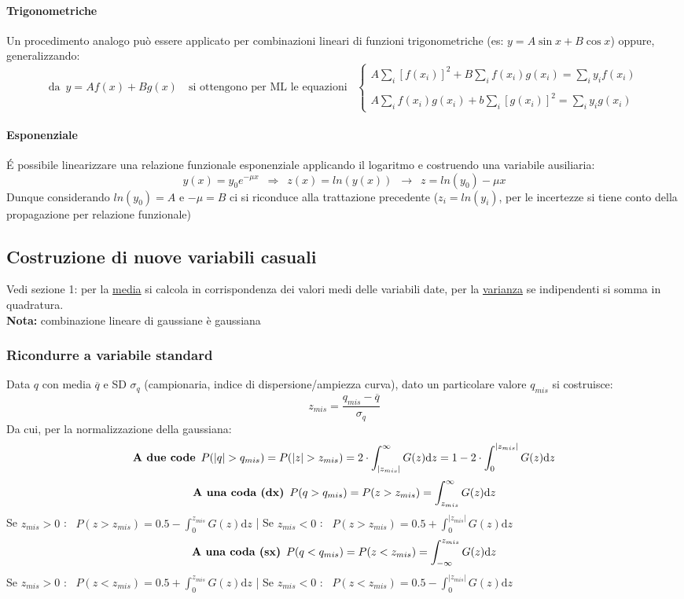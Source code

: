 \documentclass[11pt]{article}
\begin{document}
\paragraph{Trigonometriche}
Un procedimento analogo può essere applicato per combinazioni lineari di funzioni trigonometriche (es: $y = A \sin{x} + B \cos{x}$) oppure, generalizzando:
\[\textrm{da} \enspace y = A f(x) + B g(x) \quad \textrm{si ottengono per ML le equazioni } \enspace \begin{cases} A \sum_i[f(x_i)]^2 + B \sum_i f(x_i) g(x_i) = \sum_i y_i f(x_i)\\\\ A \sum_i f(x_i) g(x_i) + b \sum_i [g(x_i)]^2 = \sum_i y_i g(x_i)\end{cases}\]

\paragraph{Esponenziale}
\'E possibile linearizzare una relazione funzionale esponenziale applicando il logaritmo e costruendo una variabile ausiliaria:
\[y(x) = y_0 e^{-\mu x} \enspace \Longrightarrow \enspace z(x) = ln(y(x)) \enspace \rightarrow \enspace z = ln(y_0) - \mu x\]
Dunque considerando $ln(y_0) = A$ e $-\mu = B$ ci si riconduce alla trattazione precedente ($z_i = ln(y_i)$, per le incertezze si tiene conto della propagazione per relazione funzionale)

\subsection{Costruzione di nuove variabili casuali}
Vedi sezione 1: per la \underline{media} si calcola in corrispondenza dei valori medi delle variabili date, per la \underline{varianza} se indipendenti si somma in quadratura.
\\\textbf{Nota:} combinazione lineare di gaussiane è gaussiana

\subsubsection*{Ricondurre a variabile standard}
Data $q$ con media $\overline{q}$ e SD $\sigma_q$ (campionaria, indice di dispersione/ampiezza curva), dato un particolare valore $q_{mis}$ si costruisce:
\[z_{mis} = \frac{q_{mis} - \overline{q}}{\sigma_q} \]
Da cui, per la normalizzazione della gaussiana:
\[\textrm{\textbf{A due code}} \enspace P(|q| > q_{mis}) = P(|z| > z_{mis}) = 2 \cdot \int _{|z_{mis}|}^{\infty} G(z) \textrm{d}z = 1 - 2 \cdot \int _0^{|z_{mis}|} G(z) \textrm{d}z\]
\[\textrm{\textbf{A una coda (dx)}} \enspace P(q > q_{mis}) = P(z > z_{mis}) = \int _{z_{mis}}^{\infty} G(z) \textrm{d}z\]
Se $z_{mis} > 0$ : $\enspace P(z > z_{mis}) = 0.5 - \int _0^{z_{mis}} G(z) \textrm{d}z$ \quad \Bigg| \quad  Se $z_{mis} < 0$ : $\enspace P(z > z_{mis}) = 0.5 + \int _0^{|z_{mis}|} G(z) \textrm{d}z$
\[\textrm{\textbf{A una coda (sx)}} \enspace P(q < q_{mis}) = P(z < z_{mis}) = \int ^{z_{mis}}_{-\infty} G(z) \textrm{d}z\]
Se $z_{mis} > 0$ : $\enspace P(z < z_{mis}) = 0.5 + \int _0^{z_{mis}} G(z) \textrm{d}z$ \quad \Bigg| \quad  Se $z_{mis} < 0$ : $\enspace P(z < z_{mis}) = 0.5 - \int _0^{|z_{mis}|} G(z) \textrm{d}z$
\end{document}
